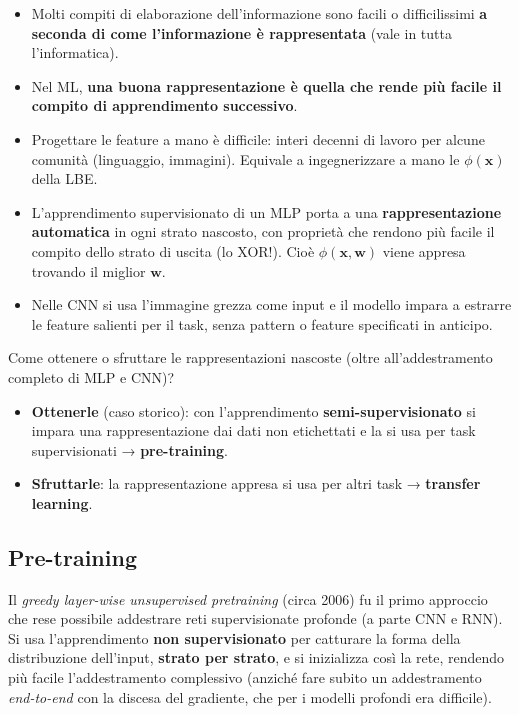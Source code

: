 \begin{itemize}
\tightlist
\item
  Molti compiti di elaborazione dell'informazione sono facili o
  difficilissimi \textbf{a seconda di come l'informazione è
  rappresentata} (vale in tutta l'informatica).
\item
  Nel ML, \textbf{una buona rappresentazione è quella che rende più
  facile il compito di apprendimento successivo}.
\item
  Progettare le feature a mano è difficile: interi decenni di lavoro per
  alcune comunità (linguaggio, immagini). Equivale a ingegnerizzare a
  mano le \(\phi(\mathbf{x})\) della LBE.
\item
  L'apprendimento supervisionato di un MLP porta a una
  \textbf{rappresentazione automatica} in ogni strato nascosto, con
  proprietà che rendono più facile il compito dello strato di uscita (lo
  XOR!). Cioè \(\phi(\mathbf{x}, \mathbf{w})\) viene appresa trovando il
  miglior \(\mathbf{w}\).
\item
  Nelle CNN si usa l'immagine grezza come input e il modello impara a
  estrarre le feature salienti per il task, senza pattern o feature
  specificati in anticipo.
\end{itemize}

Come ottenere o sfruttare le rappresentazioni nascoste (oltre
all'addestramento completo di MLP e CNN)?

\begin{itemize}
\tightlist
\item
  \textbf{Ottenerle} (caso storico): con l'apprendimento
  \textbf{semi-supervisionato} si impara una rappresentazione dai dati
  non etichettati e la si usa per task supervisionati →
  \textbf{pre-training}.
\item
  \textbf{Sfruttarle}: la rappresentazione appresa si usa per altri task
  → \textbf{transfer learning}.
\end{itemize}

\subsection{Pre-training}\label{pre-training}

Il \emph{greedy layer-wise unsupervised pretraining} (circa 2006) fu il
primo approccio che rese possibile addestrare reti supervisionate
profonde (a parte CNN e RNN). Si usa l'apprendimento \textbf{non
supervisionato} per catturare la forma della distribuzione dell'input,
\textbf{strato per strato}, e si inizializza così la rete, rendendo più
facile l'addestramento complessivo (anziché fare subito un addestramento
\emph{end-to-end} con la discesa del gradiente, che per i modelli
profondi era difficile).

